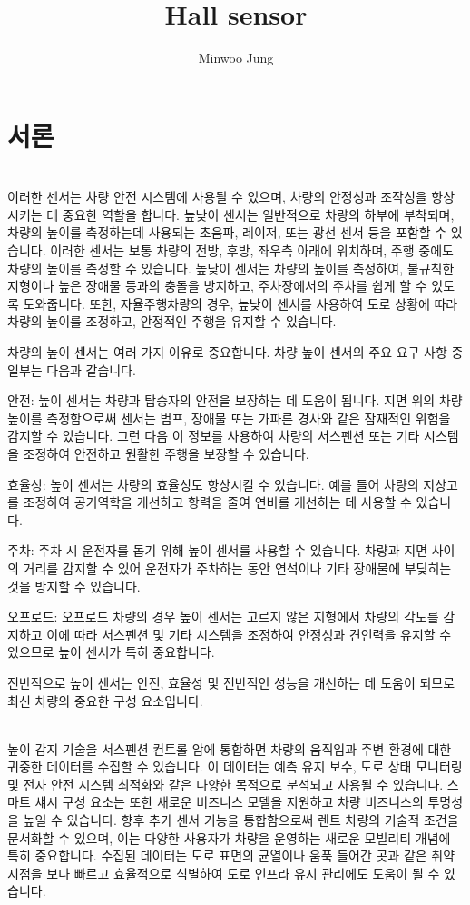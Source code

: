 \documentclass[11pt]{article}
\title{Hall sensor}
\author{Minwoo Jung}
\begin{document}
\maketitle

\section{서론}
\indent \\이러한 센서는 차량 안전 시스템에 사용될 수 있으며, 차량의 안정성과 조작성을 향상시키는 데 중요한 역할을 합니다. 높낮이 센서는 일반적으로 차량의 하부에 부착되며, 차량의 높이를 측정하는데 사용되는 초음파, 레이저, 또는 광선 센서 등을 포함할 수 있습니다. 이러한 센서는 보통 차량의 전방, 후방, 좌우측 아래에 위치하며, 주행 중에도 차량의 높이를 측정할 수 있습니다. 높낮이 센서는 차량의 높이를 측정하여, 불규칙한 지형이나 높은 장애물 등과의 충돌을 방지하고, 주차장에서의 주차를 쉽게 할 수 있도록 도와줍니다. 또한, 자율주행차량의 경우, 높낮이 센서를 사용하여 도로 상황에 따라 차량의 높이를 조정하고, 안정적인 주행을 유지할 수 있습니다.

차량의 높이 센서는 여러 가지 이유로 중요합니다. 차량 높이 센서의 주요 요구 사항 중 일부는 다음과 같습니다.

안전: 높이 센서는 차량과 탑승자의 안전을 보장하는 데 도움이 됩니다. 지면 위의 차량 높이를 측정함으로써 센서는 범프, 장애물 또는 가파른 경사와 같은 잠재적인 위험을 감지할 수 있습니다. 그런 다음 이 정보를 사용하여 차량의 서스펜션 또는 기타 시스템을 조정하여 안전하고 원활한 주행을 보장할 수 있습니다.

효율성: 높이 센서는 차량의 효율성도 향상시킬 수 있습니다. 예를 들어 차량의 지상고를 조정하여 공기역학을 개선하고 항력을 줄여 연비를 개선하는 데 사용할 수 있습니다.

주차: 주차 시 운전자를 돕기 위해 높이 센서를 사용할 수 있습니다. 차량과 지면 사이의 거리를 감지할 수 있어 운전자가 주차하는 동안 연석이나 기타 장애물에 부딪히는 것을 방지할 수 있습니다.

오프로드: 오프로드 차량의 경우 높이 센서는 고르지 않은 지형에서 차량의 각도를 감지하고 이에 따라 서스펜션 및 기타 시스템을 조정하여 안정성과 견인력을 유지할 수 있으므로 높이 센서가 특히 중요합니다.

전반적으로 높이 센서는 안전, 효율성 및 전반적인 성능을 개선하는 데 도움이 되므로 최신 차량의 중요한 구성 요소입니다.


\indent \\높이 감지 기술을 서스펜션 컨트롤 암에 통합하면 차량의 움직임과 주변 환경에 대한 귀중한 데이터를 수집할 수 있습니다. 이 데이터는 예측 유지 보수, 도로 상태 모니터링 및 전자 안전 시스템 최적화와 같은 다양한 목적으로 분석되고 사용될 수 있습니다. 스마트 섀시 구성 요소는 또한 새로운 비즈니스 모델을 지원하고 차량 비즈니스의 투명성을 높일 수 있습니다. 향후 추가 센서 기능을 통합함으로써 렌트 차량의 기술적 조건을 문서화할 수 있으며, 이는 다양한 사용자가 차량을 운영하는 새로운 모빌리티 개념에 특히 중요합니다. 수집된 데이터는 도로 표면의 균열이나 움푹 들어간 곳과 같은 취약 지점을 보다 빠르고 효율적으로 식별하여 도로 인프라 유지 관리에도 도움이 될 수 있습니다.
\end{document}
